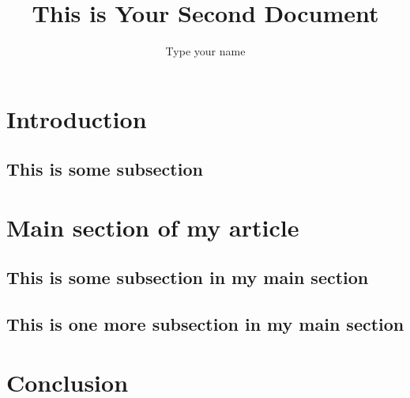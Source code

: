 \documentclass{article}
\title{This is Your Second Document}
\author{Type your name}
\begin{document}
\maketitle

\tableofcontents %

\section{Introduction}
\lipsum[1]

	\subsection{This is some subsection}
	\lipsum[2]



\section{Main section of my article}
\lipsum[4]
	\subsection{This is some subsection in my main section}
	\lipsum[6]
	\subsection{This is one more subsection in my main section}
	\lipsum[7]

\section{Conclusion}
\lipsum[8]\\

\nocite{*}
\printbibliography[heading=bibintoc]

\balance
\end{document}
